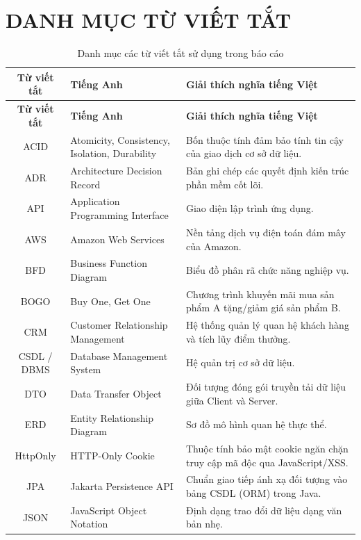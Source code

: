 \chapter*{DANH MỤC TỪ VIẾT TẮT}

\begin{longtable}{|c|p{3.5cm}|p{9cm}|}
\caption{Danh mục các từ viết tắt sử dụng trong báo cáo} \label{tab:viet_tat} \\
\hline
\textbf{Từ viết tắt} & \textbf{Tiếng Anh} & \textbf{Giải thích nghĩa tiếng Việt} \\ \hline
\endfirsthead
\hline
\textbf{Từ viết tắt} & \textbf{Tiếng Anh} & \textbf{Giải thích nghĩa tiếng Việt} \\ \hline
\endhead
\hline
\endfoot
\hline
\endlastfoot

ACID & Atomicity, Consistency, Isolation, Durability & Bốn thuộc tính đảm bảo tính tin cậy của giao dịch cơ sở dữ liệu. \\ \hline
ADR & Architecture Decision Record & Bản ghi chép các quyết định kiến trúc phần mềm cốt lõi. \\ \hline
API & Application Programming Interface & Giao diện lập trình ứng dụng. \\ \hline
AWS & Amazon Web Services & Nền tảng dịch vụ điện toán đám mây của Amazon. \\ \hline
BFD & Business Function Diagram & Biểu đồ phân rã chức năng nghiệp vụ. \\ \hline
BOGO & Buy One, Get One & Chương trình khuyến mãi mua sản phẩm A tặng/giảm giá sản phẩm B. \\ \hline
CRM & Customer Relationship Management & Hệ thống quản lý quan hệ khách hàng và tích lũy điểm thưởng. \\ \hline
CSDL / DBMS & Database Management System & Hệ quản trị cơ sở dữ liệu. \\ \hline
DTO & Data Transfer Object & Đối tượng đóng gói truyền tải dữ liệu giữa Client và Server. \\ \hline
ERD & Entity Relationship Diagram & Sơ đồ mô hình quan hệ thực thể. \\ \hline
HttpOnly & HTTP-Only Cookie & Thuộc tính bảo mật cookie ngăn chặn truy cập mã độc qua JavaScript/XSS. \\ \hline
JPA & Jakarta Persistence API & Chuẩn giao tiếp ánh xạ đối tượng vào bảng CSDL (ORM) trong Java. \\ \hline
JSON & JavaScript Object Notation & Định dạng trao đổi dữ liệu dạng văn bản nhẹ. \\ \hline

\end{longtable}
